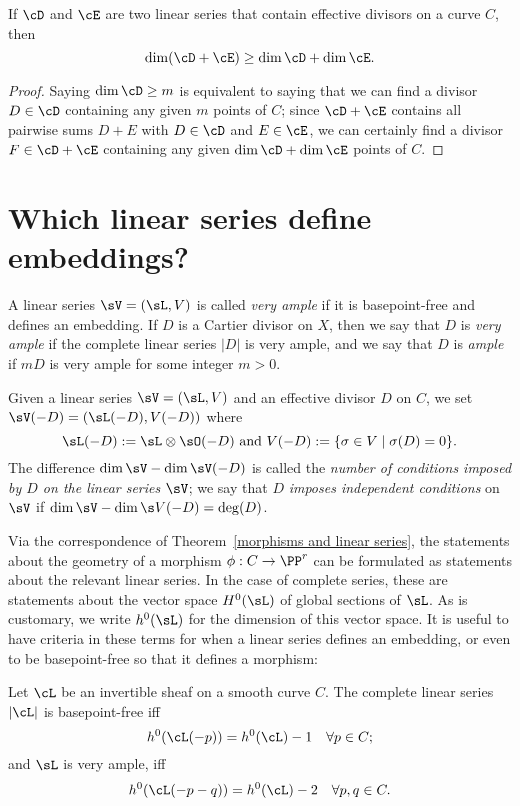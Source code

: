  
\begin{proposition}\label{sum of linear series}
 If $\cD$ and $\cE$ are two  linear series that contain effective divisors on a curve $C$, then
$$
\dim(\cD + \cE) \geq \dim \cD + \dim \cE.
$$
\end{proposition}
\begin{proof}
Saying $\dim \cD \geq m$ is equivalent to saying that we can find a divisor $D \in \cD$ containing any given $m$ points of $C$; since $\cD + \cE$ contains all pairwise sums $D + E$ with $D \in \cD$ and $E \in \cE$, we can certainly find a divisor $F \in \cD + \cE$ containing any given $\dim \cD + \dim \cE$ points of $C$.
\end{proof}

\section{Which linear series define embeddings?}

A linear series $\sV = (\sL, V)$ is called  \emph{very ample}  if it is basepoint-free and defines an embedding. If $D$ is a Cartier divisor on $X$, then we say that $D$ is \emph{very ample} if the complete linear series $|D|$ is very ample, and we say that $D$ is \emph{ample} if $mD$ is very ample for some integer $m>0$.

Given a linear series $\sV = (\sL, V)$ and an effective divisor $D$ on $C$, we  set
$
\sV(-D) = (\sL(-D),V(-D))
$
where
$$
\sL(-D): = \sL \otimes \sO(-D)\hbox{ and } V(-D) := \{ \sigma \in V \mid \sigma(D) = 0 \}.
$$
The difference $\dim \sV - \dim \sV(-D)$ is called the \emph{number of conditions imposed by $D$ on the linear series $\sV$}; we say that $D$ \emph{imposes independent conditions} on $\sV$ if $\dim \sV - \dim \s V(-D) = \deg(D)$.

Via the correspondence of Theorem~\ref{morphisms and linear series}, the statements about the geometry of a morphism $\phi : C \to \PP^r$ can be formulated as statements about the relevant linear series. In the case of complete series, these are statements about the vector space $H^{0}(\sL)$ of global sections of $\sL$. As is customary, we write $h^{0}(\sL)$ for the dimension of this vector space. It is useful to have criteria
in these terms for when a linear series defines an embedding, or even to be basepoint-free so that it
defines a morphism:

\begin{proposition}\label{very ample}\cite[Thm. IV.3.1]{H}
Let $\cL$ be an invertible sheaf on a smooth curve $C$. The complete linear series $|\cL|$ is basepoint-free iff
$$
h^0(\cL(-p)) = h^0(\cL) - 1 \quad \forall p \in C;
$$
and $\sL$ is very ample, iff
$$
h^0(\cL(-p-q)) = h^0(\cL) - 2 \quad \forall p, q \in C.
$$
\end{proposition} 

